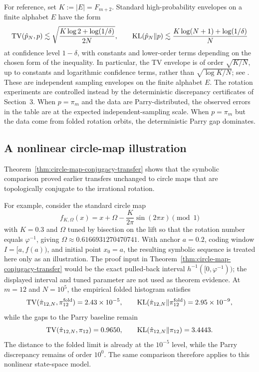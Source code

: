 For reference, set \(K:=|E|=F_{m+2}\).  Standard high-probability
envelopes on a finite alphabet \(E\) have the form
\[
\operatorname{TV}(\hat p_N,p)
\lesssim
\sqrt{\frac{K\log 2+\log(1/\delta)}{2N}},
\qquad
\operatorname{KL}(\hat p_N\|p)
\lesssim
\frac{K\log(N+1)+\log(1/\delta)}{N}
\]
at confidence level \(1-\delta\), with constants and lower-order terms
depending on the chosen form of the inequality.  In particular, the TV
envelope is of order \(\sqrt{K/N}\), up to constants and logarithmic
confidence terms, rather than \(\sqrt{\log K/N}\); see
\cite{WeissmanEtAl2003L1Empirical,DemboZeitouni2010LargeDeviations}. These
are independent sampling envelopes on the finite alphabet \(E\). The rotation
experiments are controlled instead by the deterministic discrepancy
certificates of Section~3. When
\(p=\pi_m\) and the data are Parry-distributed, the observed errors in the table
are at the expected independent-sampling scale. When \(p=\pi_m\) but the data
come from folded rotation orbits, the deterministic Parry gap dominates.

\subsection{A nonlinear circle-map illustration}

Theorem~\ref{thm:circle-map-conjugacy-transfer} shows that the symbolic
comparison proved earlier transfers unchanged to circle maps that are
topologically conjugate to the irrational rotation.

For example, consider the standard circle map
\[
f_{K,\Omega}(x)=x+\Omega-\frac{K}{2\pi}\sin(2\pi x)\pmod 1
\]
with \(K=0.3\) and \(\Omega\) tuned by bisection on the lift so that the
rotation number equals \(\varphi^{-1}\), giving
\(\Omega\approx 0.6166931270470741\). With anchor \(a=0.2\), coding window
\(I=[a,f(a))\), and initial point \(x_0=a\), the resulting symbolic sequence
is treated here only as an illustration.  The proof input in
Theorem~\ref{thm:circle-map-conjugacy-transfer} would be the exact pulled-back
interval \(h^{-1}([0,\varphi^{-1}))\); the displayed interval and tuned
parameter are not used as theorem evidence.
At \(m=12\) and \(N=10^5\), the empirical folded histogram satisfies
\[
\operatorname{TV}(\hat\pi_{12,N},\pi_{12}^{\mathrm{fold}})
=2.43\times 10^{-5},
\qquad
\operatorname{KL}(\hat\pi_{12,N}\|\pi_{12}^{\mathrm{fold}})
=2.95\times 10^{-9},
\]
while the gaps to the Parry baseline remain
\[
\operatorname{TV}(\hat\pi_{12,N},\pi_{12})=0.9650,
\qquad
\operatorname{KL}(\hat\pi_{12,N}\|\pi_{12})=3.4443.
\]
The distance to the folded limit is already at the \(10^{-5}\) level, while the
Parry discrepancy remains of order \(10^0\).  The same comparison therefore
applies to this nonlinear state-space model.


